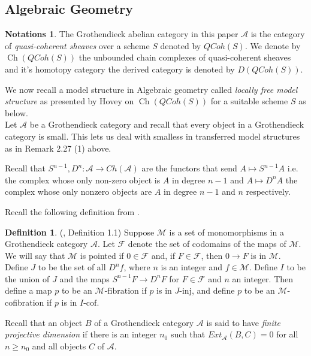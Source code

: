 \documentclass{article}
\DeclareMathOperator{\Ch}{Ch}
\theoremstyle{definition}
\newtheorem{definition}[theorem]{Definition}
\newtheorem*{notation*}{Notations}
\theoremstyle{remark}
\begin{document}
\subsection{Algebraic Geometry}
\begin{notation*}
The Grothendieck abelian category in this paper $\mathcal{A}$ is the category of \textit{quasi-coherent sheaves} over a scheme $S$ denoted by $QCoh(S)$. We denote by $\Ch(QCoh(S))$ the unbounded chain complexes of quasi-coherent sheaves and it's homotopy category the derived category is denoted by $D(QCoh(S))$.

We now recall a model structure in Algebraic geometry called \textit{locally free model structure} as presented by Hovey \cite{MR1814077} on $\Ch(QCoh(S))$ for a suitable scheme $S$ as below. \\ 
Let $\mathcal{A}$ be a Grothendieck category and recall that every object in a Grothendieck category is small. This lets us deal with smalless in transferred model structures as in Remark 2.27 (1) above.

Recall that $S^{n-1},D^{n}:\mathcal{A} \rightarrow Ch(\mathcal{A})$ are the functors that send $A \mapsto S^{n-1}A$ i.e. the complex whose only non-zero object is $A$ in degree $n-1$ and $A \mapsto D^{n}A$ the complex whose only nonzero objects are $A$ in degree $n-1$ and $n$ respectively.
\end{notation*}

Recall the following definition from \cite{MR1814077}.
\begin{definition}
    (\cite{MR1814077}, Definition 1.1) \label{def: I and J}Suppose $\mathcal{M} $ is a set of monomorphisms in a Grothendieck category $\mathcal{A}$. Let $\mathcal{F}$ denote the set of codomains of the maps of $\mathcal{M}.$ We will say that $\mathcal{M}$ is pointed if $0 \in \mathcal{F}$ and, if $F \in \mathcal{F}$, then $0 \rightarrow F$ is in $\mathcal{M}.$ Define $J$ to be the set of all $D^{n}f$, where $n$ is an integer and $f \in \mathcal{M}$. Define $I$ to be the union of $J$ and the maps $S^{n-1}F \rightarrow D^{n}F$ for $F \in \mathcal{F}$ and $n$ an integer. Then define a map $p$ to be an $\mathcal{M}\text{-fibration}$ if $p$ is in $J\text{-inj}$, and define $p$ to be an $\mathcal{M}$-cofibration if $p$ is in $I\text{-cof}$. 
\end{definition}

Recall that an object $B$ of a Grothendieck category $\mathcal{A}$ is said to have \textit{finite projective dimension} if there is an integer $n_{0}$ such that $Ext_{\mathcal{A}}(B,C)=0$ for all $n \ge n_{0}$ and all objects $C$ of $\mathcal{A}$. 
\end{document}
